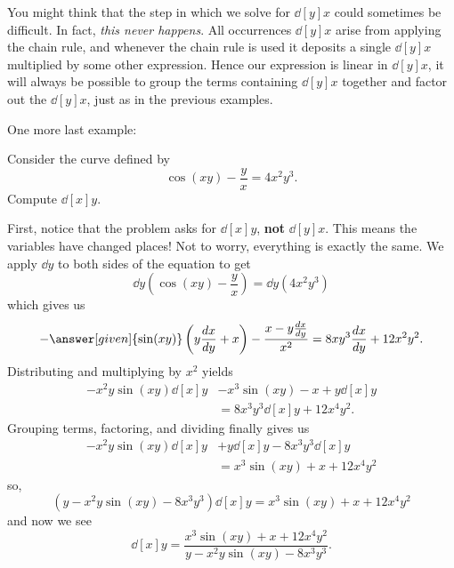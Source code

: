 \documentclass{ximera}
\begin{document}
\begin{example}
\end{example}


You might think that the step in which we solve for $\dd[y]{x}$ could
sometimes be difficult. In fact, \textit{this never happens}. All
occurrences $\dd[y]{x}$ arise from applying the chain rule, and
whenever the chain rule is used it deposits a single $\dd[y]{x}$
multiplied by some other expression. Hence our expression is linear in
$\dd[y]{x}$, it will always be possible to group the terms containing
$\dd[y]{x}$ together and factor out the $\dd[y]{x}$, just as in the
previous examples.

One more last example:

\begin{example}
Consider the curve defined by
\[
\cos(xy) - \frac{y}{x} = 4x^2 y^3.
\]
Compute $\dd[x]{y}$.
\begin{explanation}
First, notice that the problem asks for $\dd[x]{y}$, \textbf{not}
$\dd[y]{x}$. This
means the variables have changed places!  Not to worry, everything is
exactly the same.  We apply $\dd{y}$ to both sides of the equation to
get
\[
\dd{y} \left( \cos(xy) - \frac{y}{x} \right) = \dd{y} (4x^2 y^3)
\]
which gives us
\[
-\answer[given]{\sin(xy)} \left(y \dd[x]{y} + x \right) - \frac{x - y \dd[x]{y}}{x^2}
= 8xy^3 \dd[x]{y} + 12 x^2 y^2.
\]
Distributing and multiplying by $x^2$ yields
\begin{align*}
  -x^2 y \sin(xy) \dd[x]{y} &- x^3 \sin(xy) - x + y \dd[x]{y}\\
  &= 8x^3y^3 \dd[x]{y} + 12x^4y^2.
\end{align*}
Grouping terms, factoring, and dividing finally gives us
\begin{align*}
  -x^2 y \sin(xy) \dd[x]{y} &+ y \dd[x]{y} - 8x^3y^3 \dd[x]{y} \\
  &= x^3 \sin(xy) + x + 12x^4 y^2
\end{align*}
so,
\[
\left( y - x^2y\sin(xy) - 8x^3 y^3 \right) \dd[x]{y} = x^3 \sin(xy) + x + 12x^4 y^2 
\]
and now we see
\[
\dd[x]{y} = \frac{x^3 \sin(xy) + x + 12x^4 y^2}{y - x^2y\sin(xy) - 8x^3 y^3}.
\]
\end{explanation}
\end{example}
\end{document}
